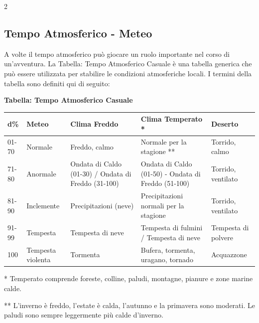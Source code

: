 \begin{multicols}{2}
\subsection{Tempo Atmosferico - Meteo}

\label{tempo-atmosferico---meteo}

A volte il tempo atmosferico può giocare un ruolo importante nel corso di un'avventura. La Tabella: Tempo Atmosferico Casuale è una tabella generica che può essere utilizzata per stabilire le condizioni atmosferiche locali. I termini della tabella sono definiti qui di seguito:

\end{multicols}

\medskip

\textbf{Tabella: Tempo Atmosferico Casuale}

\medskip

\noindent\begin{tabularx}{\linewidth}{llXXl}
	\toprule
\rowcolor{gray!20}\textbf{d\%} & \textbf{Meteo} & \textbf{Clima Freddo}& \textbf{Clima Temperato *} & \textbf{Deserto}\\
\toprule
01-70 & Normale& Freddo, calmo & Normale per la stagione ** & Torrido, calmo\\
\rowcolor{gray!20}71-80 & Anormale & Ondata di Caldo (01-30) / Ondata di Freddo (31-100)&Ondata di Caldo (01-50) - Ondata di Freddo (51-100)& Torrido, ventilato \\
81-90 & Inclemente & Precipitazioni (neve)& Precipitazioni normali per la stagione& Torrido, ventilato \\
\rowcolor{gray!20}91-99 & Tempesta & Tempesta di neve& Tempesta di fulmini / Tempesta di neve& Tempesta di polvere \\
100& Tempesta violenta& Tormenta & Bufera, tormenta, uragano, tornado & Acquazzone
\end{tabularx}

\medskip

* Temperato comprende foreste, colline, paludi, montagne, pianure e zone marine calde.

** L'inverno è freddo, l'estate è calda, l'autunno e la primavera sono moderati. Le paludi sono sempre leggermente più calde d'inverno.

